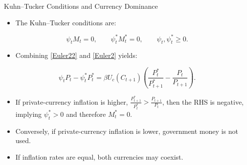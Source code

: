 \documentclass[11pt,aspectratio=169]{beamer}
\begin{document}
\begin{frame}{Kuhn--Tucker Conditions and Currency Dominance}
\small

\begin{itemize}
    \item The Kuhn--Tucker conditions are:
\end{itemize}

\vspace{0.2em}

\[
\psi_t M_t = 0,
\qquad
\psi_t^\ast M_t^\ast = 0,
\qquad
\psi_t,\psi_t^\ast \ge 0.
\]

\vspace{0.6em}

\begin{itemize}
    \item Combining \eqref{Euler22} and \eqref{Euler2} yields:
\end{itemize}

\vspace{0.2em}

\begin{equation*}
\psi_t P_t - \psi_t^{\ast} P_t^{\ast}
=
\beta U_c(C_{t+1})
\left(
\frac{P_t^{\ast}}{P_{t+1}^{\ast}}
-
\frac{P_t}{P_{t+1}}
\right).
\end{equation*}

\vspace{0.6em}

\begin{itemize}
    \item If private-currency inflation is higher,
    $\frac{P_{t+1}^{\ast}}{P_t^{\ast}}>\frac{P_{t+1}}{P_t}$,
    then the RHS is negative, implying $\psi_t^\ast>0$ and therefore $M_t^\ast=0$.
    \item Conversely, if private-currency inflation is lower, government money is not used.
    \item If inflation rates are equal, both currencies may coexist.
\end{itemize}

\end{frame}
\end{document}
